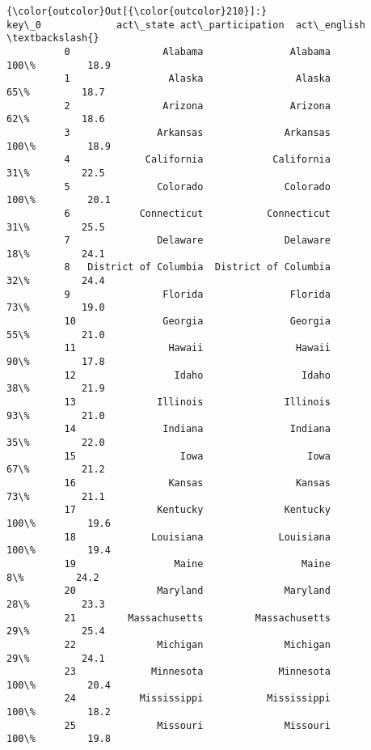 \documentclass[11pt]{article}
\begin{document}
\begin{Verbatim}[commandchars=\\\{\}]
{\color{outcolor}Out[{\color{outcolor}210}]:}                    key\_0             act\_state act\_participation  act\_english  \textbackslash{}
          0                Alabama               Alabama              100\%         18.9   
          1                 Alaska                Alaska               65\%         18.7   
          2                Arizona               Arizona               62\%         18.6   
          3               Arkansas              Arkansas              100\%         18.9   
          4             California            California               31\%         22.5   
          5               Colorado              Colorado              100\%         20.1   
          6            Connecticut           Connecticut               31\%         25.5   
          7               Delaware              Delaware               18\%         24.1   
          8   District of Columbia  District of Columbia               32\%         24.4   
          9                Florida               Florida               73\%         19.0   
          10               Georgia               Georgia               55\%         21.0   
          11                Hawaii                Hawaii               90\%         17.8   
          12                 Idaho                 Idaho               38\%         21.9   
          13              Illinois              Illinois               93\%         21.0   
          14               Indiana               Indiana               35\%         22.0   
          15                  Iowa                  Iowa               67\%         21.2   
          16                Kansas                Kansas               73\%         21.1   
          17              Kentucky              Kentucky              100\%         19.6   
          18             Louisiana             Louisiana              100\%         19.4   
          19                 Maine                 Maine                8\%         24.2   
          20              Maryland              Maryland               28\%         23.3   
          21         Massachusetts         Massachusetts               29\%         25.4   
          22              Michigan              Michigan               29\%         24.1   
          23             Minnesota             Minnesota              100\%         20.4   
          24           Mississippi           Mississippi              100\%         18.2   
          25              Missouri              Missouri              100\%         19.8   

\end{Verbatim}
\end{document}
